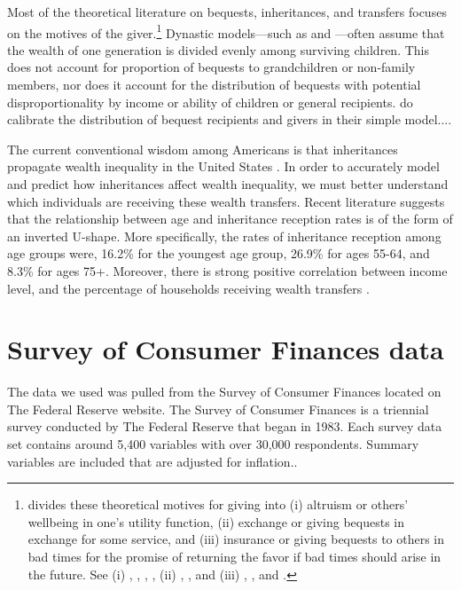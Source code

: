 \documentclass[letterpaper,12pt]{article}
\theoremstyle{definition}
\begin{document}
\begin{spacing}{1.5}
  Most of the theoretical literature on bequests, inheritances, and transfers focuses on the motives of the giver.\footnote{\citet{Wolff:2015} divides these theoretical motives for giving into (i) altruism or others' wellbeing in one's utility function, (ii) exchange or giving bequests in exchange for some service, and (iii) insurance or giving bequests to others in bad times for the promise of returning the favor if bad times should arise in the future. See (i) \citet{Barro:1974}, \citet{Becker:1974}, \citet{BeckerTomes:1979}, \citet{Tomes:1981}, (ii) \citet{BernheimEtAl:1985}, \citet{Cox:1987}, and (iii) \citet{Cox:1990}, \citet{CoxJappelli:1990}, and \citet{Kochar:1997}.} Dynastic models---such as \citet{GokhaleEtAl:2001} and \citet{FarhiWerning:2010}---often assume that the wealth of one generation is divided evenly among surviving children. This does not account for proportion of bequests to grandchildren or non-family members, nor does it account for the distribution of bequests with potential disproportionality by income or ability of children or general recipients. \citet{PikettySaez:2013} do calibrate the distribution of bequest recipients and givers in their simple model....

  The current conventional wisdom among Americans is that inheritances propagate wealth inequality in the United States \citet{Wolff:2015}. In order to accurately model and predict how inheritances affect wealth inequality, we must better understand which individuals are receiving these wealth transfers. Recent literature suggests that the relationship between age and inheritance reception rates is of the form of an inverted U-shape. More specifically, the rates of inheritance reception among age groups were, 16.2\% for the youngest age group, 26.9\% for ages 55-64, and 8.3\% for ages 75+. Moreover, there is strong positive correlation between income level, and the percentage of households receiving wealth transfers \citet{Wolff:2015}.


\section{Survey of Consumer Finances data}\label{SecSCFdata}

  The data we used was pulled from the Survey of Consumer Finances located on The Federal Reserve website. The Survey of Consumer Finances is a triennial survey conducted by The Federal Reserve that began in 1983. Each survey data set contains around 5,400 variables with over 30,000 respondents. Summary variables are included that are adjusted for inflation.\citet{FED}.


\end{spacing}
\end{document}
